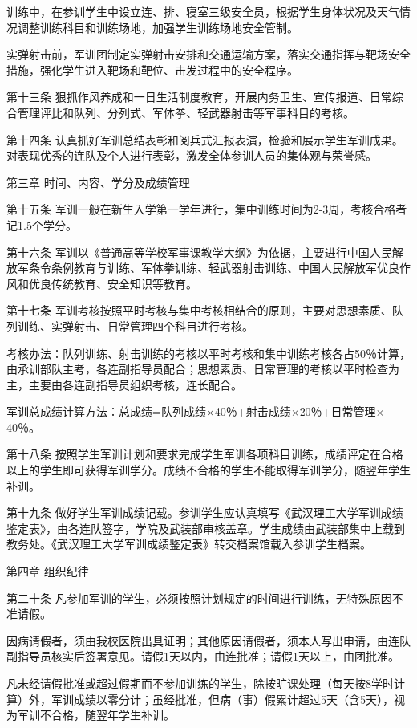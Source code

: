 \documentclass[UTF8,12pt,a4paper]{report}
\begin{document}
训练中，在参训学生中设立连、排、寝室三级安全员，根据学生身体状况及天气情况调整训练科目和训练场地，加强学生训练场地安全管制。

实弹射击前，军训团制定实弹射击安排和交通运输方案，落实交通指挥与靶场安全措施，强化学生进入靶场和靶位、击发过程中的安全程序。

第十三条 狠抓作风养成和一日生活制度教育，开展内务卫生、宣传报道、日常综合管理评比和队列、分列式、军体拳、轻武器射击等军事科目的考核。

第十四条 认真抓好军训总结表彰和阅兵式汇报表演，检验和展示学生军训成果。对表现优秀的连队及个人进行表彰，激发全体参训人员的集体观与荣誉感。

第三章 时间、内容、学分及成绩管理

第十五条 军训一般在新生入学第一学年进行，集中训练时间为2-3周，考核合格者记1.5个学分。

第十六条 军训以《普通高等学校军事课教学大纲》为依据，主要进行中国人民解放军条令条例教育与训练、军体拳训练、轻武器射击训练、中国人民解放军优良作风和优良传统教育、安全知识等教育。

第十七条 军训考核按照平时考核与集中考核相结合的原则，主要对思想素质、队列训练、实弹射击、日常管理四个科目进行考核。

考核办法：队列训练、射击训练的考核以平时考核和集中训练考核各占50％计算，由承训部队主考，各连副指导员配合；思想素质、日常管理的考核以平时检查为主，主要由各连副指导员组织考核，连长配合。

军训总成绩计算方法：总成绩=队列成绩$\times$40％+射击成绩$\times$20％+日常管理$\times$40％。

第十八条 按照学生军训计划和要求完成学生军训各项科目训练，成绩评定在合格以上的学生即可获得军训学分。成绩不合格的学生不能取得军训学分，随翌年学生补训。

第十九条 做好学生军训成绩记载。参训学生应认真填写《武汉理工大学军训成绩鉴定表》，由各连队签字，学院及武装部审核盖章。学生成绩由武装部集中上载到教务处。《武汉理工大学军训成绩鉴定表》转交档案馆载入参训学生档案。

第四章 组织纪律

第二十条 凡参加军训的学生，必须按照计划规定的时间进行训练，无特殊原因不准请假。

因病请假者，须由我校医院出具证明；其他原因请假者，须本人写出申请，由连队副指导员核实后签署意见。请假1天以内，由连批准；请假1天以上，由团批准。

凡未经请假批准或超过假期而不参加训练的学生，除按旷课处理（每天按8学时计算）外，军训成绩以零分计；虽经批准，但病（事）假累计超过5天（含5天），视为军训不合格，随翌年学生补训。
\end{document}
